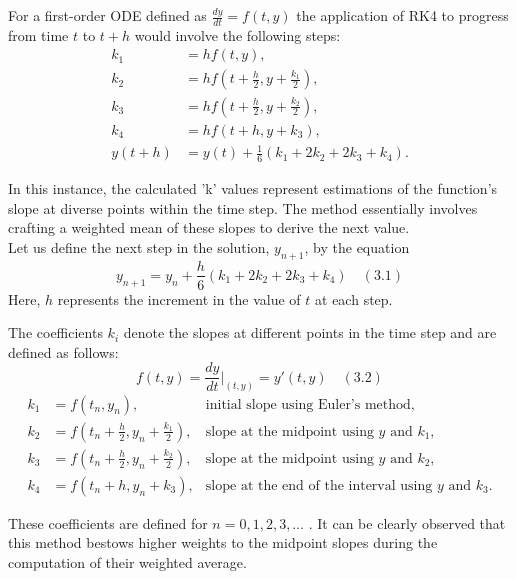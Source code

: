 For a first-order ODE defined as $\frac{dy}{dt} = f(t, y)$ the application of RK4 to progress from time $t$ to $t + h$ would involve the following steps:
\begin{equation}
\begin{aligned}
k_1 &= hf(t, y), \\
k_2 &= hf(t + \frac{h}{2}, y + \frac{k_1}{2}), \\
k_3 &= hf(t + \frac{h}{2}, y + \frac{k_2}{2}), \\
k_4 &= hf(t + h, y + k_3), \\
y(t + h) &= y(t) + \frac{1}{6}(k_1 + 2k_2 + 2k_3 + k_4).
\end{aligned}
\end{equation}

In this instance, the calculated 'k' values represent estimations of the function's slope at diverse points within the time step. The method essentially involves crafting a weighted mean of these slopes to derive the next value.\\

Let us define the next step in the solution, $y_{n+1}$, by the equation
\begin{equation}
y_{n+1} = y_n + \frac{h}{6} (k_1 + 2k_2 + 2k_3 + k_4) \quad (3.1)
\end{equation}
Here, $h$ represents the increment in the value of $t$ at each step.

The coefficients $k_i$ denote the slopes at different points in the time step and are defined as follows:
\begin{equation}
f(t, y) = \frac{dy}{dt}\bigg|_{(t, y)} = y'(t, y) \quad (3.2)
\end{equation}
\begin{align*}
k_1 &= f(t_n, y_n), &\text{initial slope using Euler's method},\\
k_2 &= f \left(t_n + \frac{h}{2}, y_n + \frac{k_1}{2}\right), &\text{slope at the midpoint using $y$ and $k_1$},\\
k_3 &= f \left(t_n + \frac{h}{2}, y_n + \frac{k_2}{2}\right), &\text{slope at the midpoint using $y$ and $k_2$},\\
k_4 &= f(t_n + h, y_n + k_3), &\text{slope at the end of the interval using $y$ and $k_3$}.
\end{align*}

These coefficients are defined for $n = 0, 1, 2, 3, \ldots$ . It can be clearly observed that this method bestows higher weights to the midpoint slopes during the computation of their weighted average.

